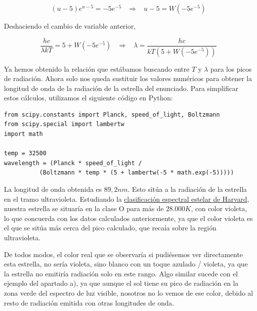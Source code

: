 \begin{enumerate}
    \begin{equation*}
    (u-5)
        e^{u-5} = -5e^{-5} \hspace{10pt} \Rightarrow \hspace{10pt} u-5 = W(-5e^{-5})
    \end{equation*}

    Deshaciendo el cambio de variable anterior,

    \begin{equation*}
        \frac{hc}{\lambda k T} = 5 + W(-5e^{-5}) \hspace{10pt} \Rightarrow \hspace{10pt}  \lambda = \frac{hc}{kT(5 + W(-5e^{-5}))}
    \end{equation*}

    Ya hemos obtenido la relación que estábamos buscando entre $T$ y $\lambda$ para los picos de radiación. Ahora solo
    nos queda sustituir los valores numéricos para obtener la longitud de onda de la radiación de la estrella del enunciado.
    Para simplificar estos cálculos, utilizamos el siguiente código en Python:\\

    \begin{verbatim}
from scipy.constants import Planck, speed_of_light, Boltzmann
from scipy.special import lambertw
import math

temp = 32500
wavelength = (Planck * speed_of_light /
          (Boltzmann * temp * (5 + lambertw(-5 * math.exp(-5)))))

    \end{verbatim}

    La longitud de onda obtenida es $89,2nm$. Esto sitúa a la radiación de la estrella en el tramo ultravioleta.
    Estudiando la \href{https://astronomy.swin.edu.au/cosmos/H/Harvard+spectral+classification}{clasificación espectral estelar de Harvard},
    nuestra estrella se situaría en la clase O para más de $28.000K$, con color violeta, lo que concuerda con los datos calculados
    anteriormente, ya que el color violeta
    es el que se sitúa más cerca del pico calculado, que recaía sobre la región ultravioleta.

    De todos modos, el color real que se observaría si pudiésemos ver directamente esta estrella, no sería violeta, sino blanco con
    un toque azulado / violeta, ya que la estrella no emitiría radiación solo en este rango. Algo similar sucede
    con el ejemplo del apartado a), ya que aunque el sol tiene su pico de radiación en la zona verde del espectro de luz visible,
    nosotros no lo vemos de ese color, debido al resto de radiación emitida con otras longitudes de onda.


\end{enumerate}



